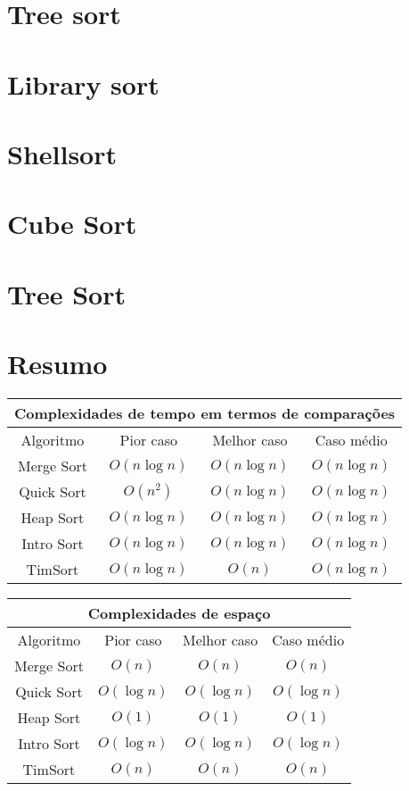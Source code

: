 \section{Tree sort}

\section{Library sort}

\section{Shellsort}

\section{Cube Sort}

\section{Tree Sort}




\section{Resumo}

\begin{center}
\begin{tabular}{||c|c|c|c||}
\hline
\multicolumn{4}{|c|}{Complexidades de tempo em termos de comparações} \\\hline
Algoritmo & Pior caso & Melhor caso & Caso médio\\
\hline
Merge Sort & $O(n\log n)$ & $O(n\log n)$ & $O(n\log n)$ \\
Quick Sort & $O(n^2)$    & $O(n\log n)$ & $O(n\log n)$ \\
Heap Sort  & $O(n\log n)$ & $O(n\log n)$ & $O(n\log n)$ \\
Intro Sort & $O(n\log n)$ & $O(n\log n)$ & $O(n\log n)$ \\
TimSort    & $O(n\log n)$ & $O(n)$       & $O(n\log n)$ \\\hline
\end{tabular}
\end{center}

\begin{center}
\begin{tabular}{||c|c|c|c||}
\hline
\multicolumn{4}{|c|}{Complexidades de espaço} \\\hline
Algoritmo & Pior caso & Melhor caso & Caso médio\\
\hline
Merge Sort & $O(n)$      & $O(n)$      & $O(n)$ \\
Quick Sort & $O(\log n)$ & $O(\log n)$ & $O(\log n)$ \\
Heap Sort  & $O(1)$      & $O(1)$      & $O(1)$ \\
Intro Sort & $O(\log n)$ & $O(\log n)$ & $O(\log n)$ \\
TimSort    & $O(n)$      & $O(n)$      & $O(n)$ \\\hline
\end{tabular}
\end{center}
